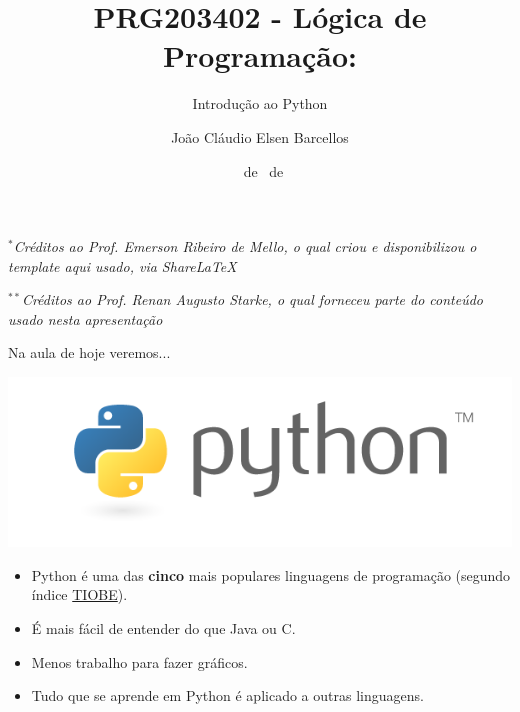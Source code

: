 \documentclass{beamer}
\title{PRG203402 - Lógica de Programação:}
\subtitle{\LARGE Introdução ao Python}
\author{João Cláudio Elsen Barcellos}
\date{\scriptsize \DAY~de \MONTH~de \YEAR}
\institute{
  Engenheiro Eletricista\\
  Formado na Universidade Federal de Santa Catarina\\
  campus Florianópolis\\
  \url{joaoclaudiobarcellos@gmail.com}
}
\begin{document}
\captionsetup{labelformat=empty}

\begin{frame}[t]
    \maketitle
    \vspace{-1cm}
    \begin{flushleft}
        \vfill
        \textit{\tiny $^{*}$Créditos ao Prof. Emerson Ribeiro de Mello, o qual criou e disponibilizou o template aqui usado, via ShareLaTeX}\par
        \textit{\tiny $^{**}$Créditos ao Prof. Renan Augusto Starke, o qual forneceu parte do conteúdo usado nesta apresentação}
    \end{flushleft}
\end{frame}

\begin{frame}[t]{Na aula de hoje veremos...}
    \tableofcontents
\end{frame}

\begin{frame}

\begin{center}
\includegraphics[scale=0.3]{./figures/python-logo.png}
\end{center}
  
  \begin{itemize}
   \vfill \item Python é uma das \textbf{cinco} mais populares linguagens de programação (segundo índice \href{http://www.tiobe.com/tiobe-index/}{TIOBE}). 
   \vfill \item É mais fácil de entender do que Java ou C.
   \vfill \item Menos trabalho para fazer gráficos.
   \vfill \item Tudo que se aprende em Python é aplicado a outras linguagens.
  \end{itemize} 

\end{frame}
\end{document}
